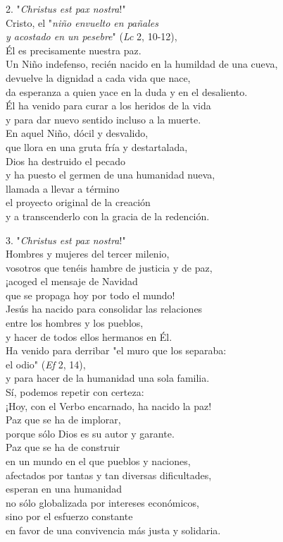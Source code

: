 2. "\emph{Christus est pax nostra}!"\\
Cristo, el "\emph{niño envuelto en pañales\\
	y acostado en un pesebre}" (\emph{Lc} 2, 10-12),\\
Él es precisamente nuestra paz.\\
Un Niño indefenso, recién nacido en la humildad de una cueva,\\
devuelve la dignidad a cada vida que nace,\\
da esperanza a quien yace en la duda y en el desaliento.\\
Él ha venido para curar a los heridos de la vida\\
y para dar nuevo sentido incluso a la muerte.\\
En aquel Niño, dócil y desvalido,\\
que llora en una gruta fría y destartalada,\\
Dios ha destruido el pecado\\
y ha puesto el germen de una humanidad nueva,\\
llamada a llevar a término\\
el proyecto original de la creación\\
y a transcenderlo con la gracia de la redención.

3. "\emph{Christus est pax nostra}!"\\
Hombres y mujeres del tercer milenio,\\
vosotros que tenéis hambre de justicia y de paz,\\
¡acoged el mensaje de Navidad\\
que se propaga hoy por todo el mundo!\\
Jesús ha nacido para consolidar las relaciones\\
entre los hombres y los pueblos,\\
y hacer de todos ellos hermanos en Él.\\
Ha venido para derribar "el muro que los separaba:\\
el odio" (\emph{Ef} 2, 14),\\
y para hacer de la humanidad una sola familia.\\
Sí, podemos repetir con certeza:\\
¡Hoy, con el Verbo encarnado, ha nacido la paz!\\
Paz que se ha de implorar,\\
porque sólo Dios es su autor y garante.\\
Paz que se ha de construir\\
en un mundo en el que pueblos y naciones,\\
afectados por tantas y tan diversas dificultades,\\
esperan en una humanidad\\
no sólo globalizada por intereses económicos,\\
sino por el esfuerzo constante\\
en favor de una convivencia más justa y solidaria.

